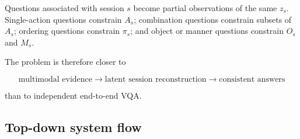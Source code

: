 \documentclass[12pt,a4paper]{article}
\begin{document}
Questions associated with session \(s\) become partial observations of the same
\(z_s\). Single-action questions constrain \(A_s\); combination questions
constrain subsets of \(A_s\); ordering questions constrain \(\pi_s\); and object
or manner questions constrain \(O_s\) and \(M_s\).

The problem is therefore closer to

\[
    \boxed{
    \text{multimodal evidence}
    \rightarrow
    \text{latent session reconstruction}
    \rightarrow
    \text{consistent answers}
    }
\]

than to independent end-to-end VQA.

\subsection{Top-down system flow}
\end{document}
